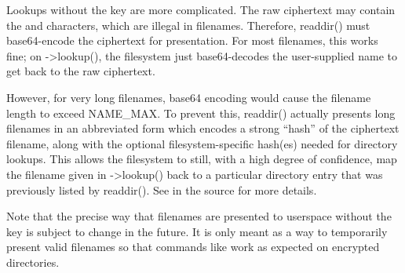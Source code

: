 \documentclass[a4paper,8pt,english]{sphinxmanual}
\begin{document}
Lookups without the key are more complicated.  The raw ciphertext may
contain the  and \code{/} characters, which are illegal in
filenames.  Therefore, readdir() must base64-encode the ciphertext for
presentation.  For most filenames, this works fine; on -\textgreater{}lookup(), the
filesystem just base64-decodes the user-supplied name to get back to
the raw ciphertext.

However, for very long filenames, base64 encoding would cause the
filename length to exceed NAME\_MAX.  To prevent this, readdir()
actually presents long filenames in an abbreviated form which encodes
a strong ``hash'' of the ciphertext filename, along with the optional
filesystem-specific hash(es) needed for directory lookups.  This
allows the filesystem to still, with a high degree of confidence, map
the filename given in -\textgreater{}lookup() back to a particular directory entry
that was previously listed by readdir().  See  in the source for more details.

Note that the precise way that filenames are presented to userspace
without the key is subject to change in the future.  It is only meant
as a way to temporarily present valid filenames so that commands like
 work as expected on encrypted directories.



\renewcommand{\indexname}{Index}
\printindex
\end{document}
